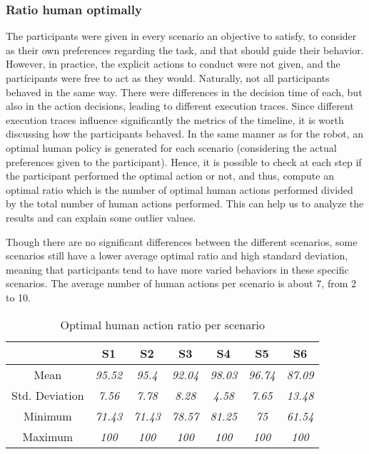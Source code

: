 \subsubsection*{Ratio human optimally}
The participants were given in every scenario an objective to satisfy, to consider as their own preferences regarding the task, and that should guide their behavior. However, in practice, the explicit actions to conduct were not given, and the participants were free to act as they would. Naturally, not all participants behaved in the same way. There were differences in the decision time of each, but also in the action decisions, leading to different execution traces. Since different execution traces influence significantly the metrics of the timeline, it is worth discussing how the participants behaved.
In the same manner as for the robot, an optimal human policy is generated for each scenario (considering the actual preferences given to the participant). Hence, it is possible to check at each step if the participant performed the optimal action or not, and thus, compute an optimal ratio which is the number of optimal human actions performed divided by the total number of human actions performed. This can help us to analyze the results and can explain some outlier values. 

Though there are no significant differences between the different scenarios, some scenarios still have a lower average optimal ratio and high standard deviation, meaning that participants tend to have more varied behaviors in these specific scenarios. 
The average number of human actions per scenario is about 7, from 2 to 10. 

\begin{table}[h]
    \center
    \begin{tabular}{c|c|c|c|c|c|c|}
    \cline{2-7}
    \textbf{}                            & S1             & S2             & S3             & S4             & S5            & S6             \\ \hline
    \multicolumn{1}{|c|}{Mean}           & \textit{95.52} & \textit{95.4} & \textit{92.04} & \textit{98.03} & \textit{96.74} & \textit{87.09} \\ \hline
    \multicolumn{1}{|c|}{Std. Deviation} & \textit{7.56}  & \textit{7.78}  & \textit{8.28}  & \textit{4.58}  & \textit{7.65} & \textit{13.48} \\ \hline
    \multicolumn{1}{|c|}{Minimum}        & \textit{71.43} & \textit{71.43} & \textit{78.57} & \textit{81.25} & \textit{75}   & \textit{61.54} \\ \hline
    \multicolumn{1}{|c|}{Maximum}        & \textit{100}   & \textit{100}   & \textit{100}   & \textit{100}   & \textit{100}  & \textit{100}   \\ \hline
    \end{tabular}
    \caption{Optimal human action ratio per scenario}
    \label{tab:optimal_human_ratio}
    \end{table}



